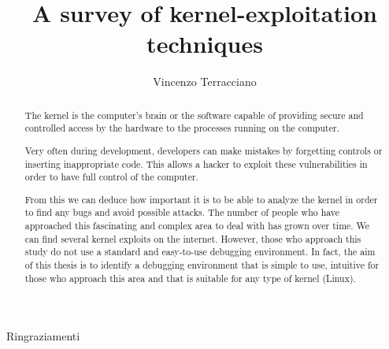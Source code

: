 \documentclass{masterthesis}
\newcommand{\vtnote}[1]{\todo[color=green!20]{#1}}
\begin{document}
\title{A survey of kernel-exploitation techniques}

\author{Vincenzo Terracciano}



\maketitle

\begin{abstract}
The kernel is the computer’s brain or the software capable of providing secure and controlled access by the hardware to the processes running on the computer.

Very often during development, developers can make mistakes by forgetting controls or inserting inappropriate code. This allows a hacker to exploit these vulnerabilities in order to have full control of the computer.

\vtnote{aggiunto}
From this we can deduce how important it is to be able to analyze the kernel in order to find any bugs and avoid possible attacks. The number of people who have approached this fascinating and complex area to deal with has grown over time. We can find several kernel exploits on the internet. However, those who approach this study do not use a standard and easy-to-use debugging environment.
In fact, the aim of this thesis is to identify a debugging environment that is simple to use, intuitive for those who approach this area and that is suitable for any type of kernel (Linux).



\end{abstract}

\begin{acknowledgements}Ringraziamenti
\end{acknowledgements}


\tableofcontents
\end{document}
